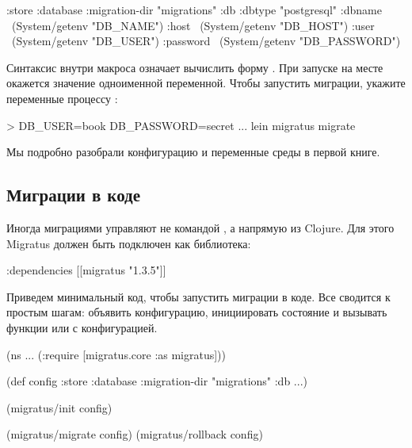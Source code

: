 \begin{english}
  \begin{clojure/lines}
{:store :database
 :migration-dir "migrations"
 :db {:dbtype "postgresql"
      :dbname ~(System/getenv "DB_NAME")
      :host ~(System/getenv "DB_HOST")
      :user ~(System/getenv "DB_USER")
      :password ~(System/getenv "DB_PASSWORD")}}
  \end{clojure/lines}
\end{english}

Синтаксис  внутри макроса  означает вычислить форму . При запуске  на месте  окажется значение одноименной переменной. Чтобы запустить миграции, укажите переменные процессу :

\begin{english}
  \begin{bash}
> DB_USER=book DB_PASSWORD=secret ... lein migratus migrate
  \end{bash}
\end{english}

Мы подробно разобрали конфигурацию и переменные среды в первой книге.

\subsection{Миграции в коде}

Иногда миграциями управляют не командой , а напрямую из Clojure. Для этого Migratus должен быть подключен как библиотека:

\begin{english}
  \begin{clojure}
{:dependencies [[migratus "1.3.5"]]}
  \end{clojure}
\end{english}

Приведем минимальный код, чтобы запустить миграции в коде. Все сводится к простым шагам: объявить конфигурацию, инициировать состояние и вызывать функции  или  с конфигурацией.

\begin{english}
  \begin{clojure}
(ns ...
  (:require
   [migratus.core :as migratus]))

(def config
  {:store :database
   :migration-dir "migrations"
   :db {...}})

(migratus/init config)

(migratus/migrate config)
(migratus/rollback config)
  \end{clojure}
\end{english}

